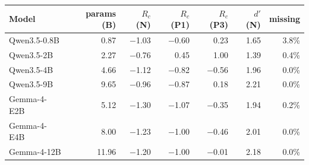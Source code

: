 \begin{tabular}{lrrrrrr}
\toprule
Model & params (B) & $R_c$ (N) & $R_c$ (P1) & $R_c$ (P3) & $d'$ (N) & missing \\
\midrule
Qwen3.5-0.8B & 0.87 & $-$1.03 & $-$0.60 & 0.23 & 1.65 & 3.8\% \\
Qwen3.5-2B & 2.27 & $-$0.76 & 0.45 & 1.00 & 1.39 & 0.4\% \\
Qwen3.5-4B & 4.66 & $-$1.12 & $-$0.82 & $-$0.56 & 1.96 & 0.0\% \\
Qwen3.5-9B & 9.65 & $-$0.96 & $-$0.87 & 0.18 & 2.21 & 0.0\% \\
\midrule
Gemma-4-E2B & 5.12 & $-$1.30 & $-$1.07 & $-$0.35 & 1.94 & 0.2\% \\
Gemma-4-E4B & 8.00 & $-$1.23 & $-$1.00 & $-$0.46 & 2.01 & 0.0\% \\
Gemma-4-12B & 11.96 & $-$1.20 & $-$1.00 & $-$0.01 & 2.18 & 0.0\% \\
\bottomrule
\end{tabular}
